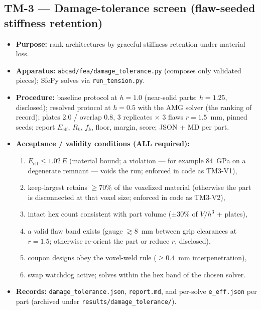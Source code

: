 \documentclass[11pt]{article}
\begin{document}
\subsection*{TM-3 --- Damage-tolerance screen (flaw-seeded stiffness retention)}
\begin{itemize}[nosep]
  \item \textbf{Purpose:} rank architectures by graceful stiffness retention under material loss.
  \item \textbf{Apparatus:} \texttt{abcad/fea/damage\_tolerance.py} (composes only validated pieces);
    SfePy solves via \texttt{run\_tension.py}.
  \item \textbf{Procedure:} baseline protocol at $h=1.0$ (near-solid parts: $h=1.25$, disclosed);
    resolved protocol at $h=0.5$ with the AMG solver (the ranking of record); plates 2.0 / overlap 0.8,
    3 replicates $\times$ 3 flaws $r=1.5$~mm, pinned seeds; report $E_{\mathrm{eff}}$, $R_k$, $f_k$,
    floor, margin, score; JSON + MD per part.
  \item \textbf{Acceptance / validity conditions (ALL required):}
    \begin{enumerate}[nosep]
      \item $E_{\mathrm{eff}} \le 1.02\,E$ (material bound; a violation --- for example 84~GPa on a
            degenerate remnant --- voids the run; enforced in code as TM3-V1),
      \item keep-largest retains $\ge 70\%$ of the voxelized material (otherwise the part is
            disconnected at that voxel size; enforced in code as TM3-V2),
      \item intact hex count consistent with part volume ($\pm 30\%$ of $V/h^3$ + plates),
      \item a valid flaw band exists (gauge $\gtrsim 8$~mm between grip clearances at $r=1.5$;
            otherwise re-orient the part or reduce $r$, disclosed),
      \item coupon designs obey the voxel-weld rule ($\ge 0.4$~mm interpenetration),
      \item swap watchdog active; solves within the hex band of the chosen solver.
    \end{enumerate}
  \item \textbf{Records:} \texttt{damage\_tolerance.json}, \texttt{report.md}, and per-solve
    \texttt{e\_eff.json} per part (archived under \texttt{results/damage\_tolerance/}).
\end{itemize}
\end{document}

